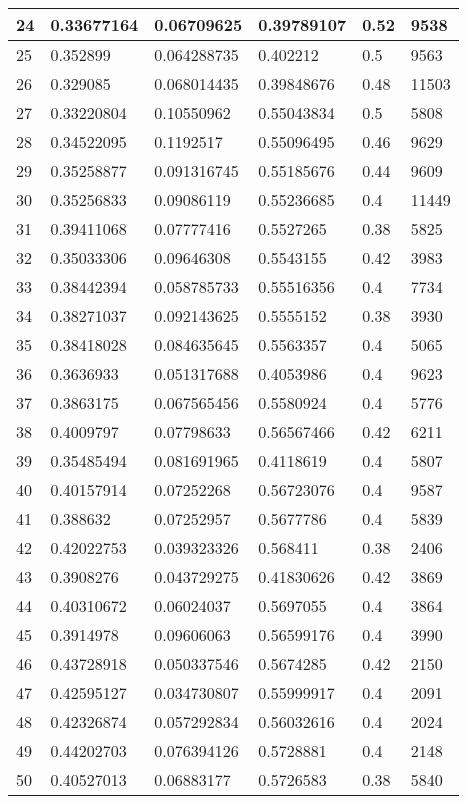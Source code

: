 \begin{longtable}{|l|l|l|l|l|l|}
24 & 0.33677164 & 0.06709625 & 0.39789107 & 0.52 & 9538 \\ \hline 
25 & 0.352899 & 0.064288735 & 0.402212 & 0.5 & 9563 \\ \hline 
26 & 0.329085 & 0.068014435 & 0.39848676 & 0.48 & 11503 \\ \hline 
27 & 0.33220804 & 0.10550962 & 0.55043834 & 0.5 & 5808 \\ \hline 
28 & 0.34522095 & 0.1192517 & 0.55096495 & 0.46 & 9629 \\ \hline 
29 & 0.35258877 & 0.091316745 & 0.55185676 & 0.44 & 9609 \\ \hline 
30 & 0.35256833 & 0.09086119 & 0.55236685 & 0.4 & 11449 \\ \hline 
31 & 0.39411068 & 0.07777416 & 0.5527265 & 0.38 & 5825 \\ \hline 
32 & 0.35033306 & 0.09646308 & 0.5543155 & 0.42 & 3983 \\ \hline 
33 & 0.38442394 & 0.058785733 & 0.55516356 & 0.4 & 7734 \\ \hline 
34 & 0.38271037 & 0.092143625 & 0.5555152 & 0.38 & 3930 \\ \hline 
35 & 0.38418028 & 0.084635645 & 0.5563357 & 0.4 & 5065 \\ \hline 
36 & 0.3636933 & 0.051317688 & 0.4053986 & 0.4 & 9623 \\ \hline 
37 & 0.3863175 & 0.067565456 & 0.5580924 & 0.4 & 5776 \\ \hline 
38 & 0.4009797 & 0.07798633 & 0.56567466 & 0.42 & 6211 \\ \hline 
39 & 0.35485494 & 0.081691965 & 0.4118619 & 0.4 & 5807 \\ \hline 
40 & 0.40157914 & 0.07252268 & 0.56723076 & 0.4 & 9587 \\ \hline 
41 & 0.388632 & 0.07252957 & 0.5677786 & 0.4 & 5839 \\ \hline 
42 & 0.42022753 & 0.039323326 & 0.568411 & 0.38 & 2406 \\ \hline 
43 & 0.3908276 & 0.043729275 & 0.41830626 & 0.42 & 3869 \\ \hline 
44 & 0.40310672 & 0.06024037 & 0.5697055 & 0.4 & 3864 \\ \hline 
45 & 0.3914978 & 0.09606063 & 0.56599176 & 0.4 & 3990 \\ \hline 
46 & 0.43728918 & 0.050337546 & 0.5674285 & 0.42 & 2150 \\ \hline 
47 & 0.42595127 & 0.034730807 & 0.55999917 & 0.4 & 2091 \\ \hline 
48 & 0.42326874 & 0.057292834 & 0.56032616 & 0.4 & 2024 \\ \hline 
49 & 0.44202703 & 0.076394126 & 0.5728881 & 0.4 & 2148 \\ \hline 
50 & 0.40527013 & 0.06883177 & 0.5726583 & 0.38 & 5840 \\ \hline 
\end{longtable}